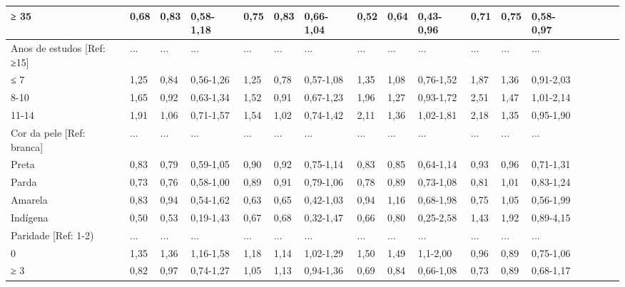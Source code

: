 \documentclass{article}
\begin{document}
\begin{table}
\begin{xtabular}{ l | l | l | l | l l | l | l | l | l | l | l | l | l | l | l |
l }
≥ 35
& 0,68
& 0,83
& 0,58-1,18
& 0,75
& 0,83
& 0,66-1,04
& 0,52
& 0,64
& 0,43-0,96
& 0,71
& 0,75
& 0,58-0,97
\\ \hline

Anos de estudos [Ref: ≥15]
& ...
& ...
& ...
& ...
& ...
& ...
& ...
& ...
& ...
& ...
& ...
& ...
\\ \hline

≤ 7
& 1,25
& 0,84
& 0,56-1,26
& 1,25
& 0,78
& 0,57-1,08
& 1,35
& 1,08
& 0,76-1,52
& 1,87
& 1,36
& 0,91-2,03
\\ \hline

8-10
& 1,65
& 0,92
& 0,63-1,34
& 1,52
& 0,91
& 0,67-1,23
& 1,96
& 1,27
& 0,93-1,72
& 2,51
& 1,47
& 1,01-2,14
\\ \hline

11-14
& 1,91
& 1,06
& 0,71-1,57
& 1,54
& 1,02
& 0,74-1,42
& 2,11
& 1,36
& 1,02-1,81
& 2,18
& 1,35
& 0,95-1,90
\\ \hline

Cor da pele [Ref: branca]
& ...
& ...
& ...
& ...
& ...
& ...
& ...
& ...
& ...
& ...
& ...
& ...
\\ \hline

Preta
& 0,83
& 0,79
& 0,59-1,05
& 0,90
& 0,92
& 0,75-1,14
& 0,83
& 0,85
& 0,64-1,14
& 0,93
& 0,96
& 0,71-1,31
\\ \hline

Parda
& 0,73
& 0,76
& 0,58-1,00
& 0,89
& 0,91
& 0,79-1,06
& 0,78
& 0,89
& 0,73-1,08
& 0,81
& 1,01
& 0,83-1,24
\\ \hline

Amarela
& 0,83
& 0,94
& 0,54-1,62
& 0,63
& 0,65
& 0,42-1,03
& 0,94
& 1,16
& 0,68-1,98
& 0,75
& 1,05
& 0,56-1,99
\\ \hline

Indígena
& 0,50
& 0,53
& 0,19-1,43
& 0,67
& 0,68
& 0,32-1,47
& 0,66
& 0,80
& 0,25-2,58
& 1,43
& 1,92
& 0,89-4,15
\\ \hline

Paridade [Ref: 1-2)
& ...
& ...
& ...
& ...
& ...
& ...
& ...
& ...
& ...
& ...
& ...
& ...
\\ \hline

0
& 1,35
& 1,36
& 1,16-1,58
& 1,18
& 1,14
& 1,02-1,29
& 1,50
& 1,49
& 1,1-2,00
& 0,96
& 0,89
& 0,75-1,06
\\ \hline

≥ 3
& 0,82
& 0,97
& 0,74-1,27
& 1,05
& 1,13
& 0,94-1,36
& 0,69
& 0,84
& 0,66-1,08
& 0,73
& 0,89
& 0,68-1,17
\\ \hline

\end{xtabular}
\end{table}
\end{document}
